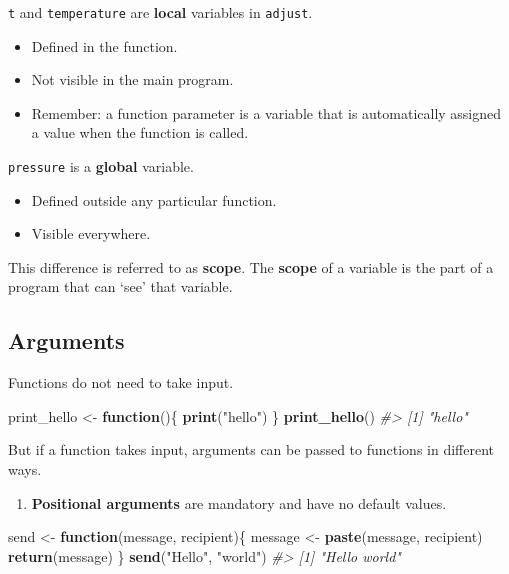 \documentclass[]{book}
\newenvironment{Shaded}{\begin{snugshade}}{\end{snugshade}}
\newcommand{\KeywordTok}[1]{\textcolor[rgb]{0.13,0.29,0.53}{\textbf{#1}}}
\newcommand{\StringTok}[1]{\textcolor[rgb]{0.31,0.60,0.02}{#1}}
\newcommand{\CommentTok}[1]{\textcolor[rgb]{0.56,0.35,0.01}{\textit{#1}}}
\newcommand{\ControlFlowTok}[1]{\textcolor[rgb]{0.13,0.29,0.53}{\textbf{#1}}}
\newcommand{\NormalTok}[1]{#1}
\providecommand{\tightlist}{%
  \setlength{\itemsep}{0pt}\setlength{\parskip}{0pt}}
\begin{document}
\texttt{t} and \texttt{temperature} are \textbf{local} variables in
\texttt{adjust}.

\begin{itemize}
\tightlist
\item
  Defined in the function.
\item
  Not visible in the main program.
\item
  Remember: a function parameter is a variable that is automatically
  assigned a value when the function is called.
\end{itemize}

\texttt{pressure} is a \textbf{global} variable.

\begin{itemize}
\tightlist
\item
  Defined outside any particular function.
\item
  Visible everywhere.
\end{itemize}

This difference is referred to as \textbf{scope}. The \textbf{scope} of
a variable is the part of a program that can `see' that variable.

\subsection{Arguments}\label{arguments-1}

Functions do not need to take input.

\begin{Shaded}
\begin{Highlighting}[]
\NormalTok{print_hello <-}\StringTok{ }\ControlFlowTok{function}\NormalTok{()\{}
    \KeywordTok{print}\NormalTok{(}\StringTok{"hello"}\NormalTok{)}
\NormalTok{\}}
\KeywordTok{print_hello}\NormalTok{()}
\CommentTok{#> [1] "hello"}
\end{Highlighting}
\end{Shaded}

But if a function takes input, arguments can be passed to functions in
different ways.

\begin{enumerate}
\def\labelenumi{\arabic{enumi})}
\tightlist
\item
  \textbf{Positional arguments} are mandatory and have no default
  values.
\end{enumerate}

\begin{Shaded}
\begin{Highlighting}[]
\NormalTok{send <-}\StringTok{ }\ControlFlowTok{function}\NormalTok{(message, recipient)\{}
\NormalTok{  message <-}\StringTok{ }\KeywordTok{paste}\NormalTok{(message, recipient)}
  \KeywordTok{return}\NormalTok{(message)}
\NormalTok{\}}
\KeywordTok{send}\NormalTok{(}\StringTok{"Hello"}\NormalTok{, }\StringTok{"world"}\NormalTok{)}
\CommentTok{#> [1] "Hello world"}
\end{Highlighting}
\end{Shaded}
\end{document}
